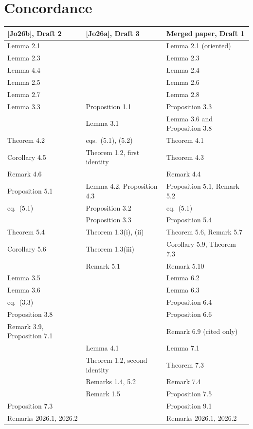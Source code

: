 \documentclass[12pt,letterpaper]{article}
\begin{document}
\section{Concordance}
\begin{center}
\small
\begin{tabular}{@{}lll@{}}
\toprule
{[Jo26b]}, Draft 2 & {[Jo26a]}, Draft 3 & Merged paper, Draft 1\\
\midrule
Lemma 2.1 & & Lemma 2.1 (oriented)\\
Lemma 2.3 & & Lemma 2.3\\
Lemma 4.4 & & Lemma 2.4\\
Lemma 2.5 & & Lemma 2.6\\
Lemma 2.7 & & Lemma 2.8\\
Lemma 3.3 & Proposition 1.1 & Proposition 3.3\\
 & Lemma 3.1 & Lemma 3.6 and Proposition 3.8\\
Theorem 4.2 & eqs.\ (5.1), (5.2) & Theorem 4.1\\
Corollary 4.5 & Theorem 1.2, first identity & Theorem 4.3\\
Remark 4.6 & & Remark 4.4\\
Proposition 5.1 & Lemma 4.2, Proposition 4.3 & Proposition 5.1, Remark 5.2\\
eq.\ (5.1) & Proposition 3.2 & eq.\ (5.1)\\
 & Proposition 3.3 & Proposition 5.4\\
Theorem 5.4 & Theorem 1.3(i), (ii) & Theorem 5.6, Remark 5.7\\
Corollary 5.6 & Theorem 1.3(iii) & Corollary 5.9, Theorem 7.3\\
 & Remark 5.1 & Remark 5.10\\
Lemma 3.5 & & Lemma 6.2\\
Lemma 3.6 & & Lemma 6.3\\
eq.\ (3.3) & & Proposition 6.4\\
Proposition 3.8 & & Proposition 6.6\\
Remark 3.9, Proposition 7.1 & & Remark 6.9 (cited only)\\
 & Lemma 4.1 & Lemma 7.1\\
 & Theorem 1.2, second identity & Theorem 7.3\\
 & Remarks 1.4, 5.2 & Remark 7.4\\
 & Remark 1.5 & Proposition 7.5\\
Proposition 7.3 & & Proposition 9.1\\
Remarks 2026.1, 2026.2 & & Remarks 2026.1, 2026.2\\
\bottomrule
\end{tabular}
\end{center}
\end{document}
